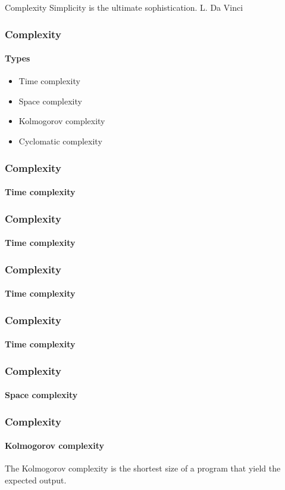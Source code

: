 \begin{sepframe}{Complexity}
    {\scriptsize{Simplicity is the ultimate sophistication. L. Da Vinci}}
\end{sepframe}

\begin{frame}
    \frametitle{Complexity}
    \framesubtitle{Types}

    \begin{itemize}[<+->]
        \item Time complexity
        \item Space complexity
        \item Kolmogorov complexity
        \item Cyclomatic complexity
    \end{itemize}
\end{frame}

\begin{frame}
    \frametitle{Complexity}
    \framesubtitle{Time complexity}
    
\end{frame}

\begin{frame}
    \frametitle{Complexity}
    \framesubtitle{Time complexity}
    
\end{frame}

\begin{frame}
    \frametitle{Complexity}
    \framesubtitle{Time complexity}
    
\end{frame}

\begin{frame}
    \frametitle{Complexity}
    \framesubtitle{Time complexity}
    
\end{frame}

\begin{frame}
    \frametitle{Complexity}
    \framesubtitle{Space complexity}
    
\end{frame}

\begin{frame}
    \frametitle{Complexity}
    \framesubtitle{Kolmogorov complexity}

    The Kolmogorov complexity is the shortest size of a program that yield the
    expected output.
\end{frame}


